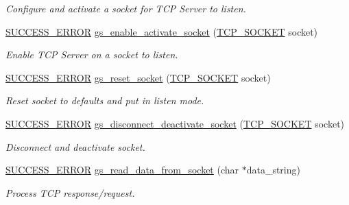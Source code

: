 \begin{DoxyCompactItemize}
\begin{DoxyCompactList}\small\item\em Configure and activate a socket for T\+CP Server to listen. \end{DoxyCompactList}\item 
\hyperlink{group__wireless__interface_ga2e53871073b531f122f463441c113633}{S\+U\+C\+C\+E\+S\+S\+\_\+\+E\+R\+R\+OR} \hyperlink{group__wireless__interface_ga4e5e8f55a064c7537a8398df1d7da8e0}{gs\+\_\+enable\+\_\+activate\+\_\+socket} (\hyperlink{group__wireless__interface_gab2d7ad3f99c2b04b0f5f5a77eefc5355}{T\+C\+P\+\_\+\+S\+O\+C\+K\+ET} socket)
\begin{DoxyCompactList}\small\item\em Enable T\+CP Server on a socket to listen. \end{DoxyCompactList}\item 
\hyperlink{group__wireless__interface_ga2e53871073b531f122f463441c113633}{S\+U\+C\+C\+E\+S\+S\+\_\+\+E\+R\+R\+OR} \hyperlink{group__wireless__interface_gac877437386a7198c2fe889ca2c13a16a}{gs\+\_\+reset\+\_\+socket} (\hyperlink{group__wireless__interface_gab2d7ad3f99c2b04b0f5f5a77eefc5355}{T\+C\+P\+\_\+\+S\+O\+C\+K\+ET} socket)
\begin{DoxyCompactList}\small\item\em Reset socket to defaults and put in listen mode. \end{DoxyCompactList}\item 
\hyperlink{group__wireless__interface_ga2e53871073b531f122f463441c113633}{S\+U\+C\+C\+E\+S\+S\+\_\+\+E\+R\+R\+OR} \hyperlink{group__wireless__interface_ga2e35088a7ecd803f403b6e0afa21b179}{gs\+\_\+disconnect\+\_\+deactivate\+\_\+socket} (\hyperlink{group__wireless__interface_gab2d7ad3f99c2b04b0f5f5a77eefc5355}{T\+C\+P\+\_\+\+S\+O\+C\+K\+ET} socket)
\begin{DoxyCompactList}\small\item\em Disconnect and deactivate socket. \end{DoxyCompactList}\item 
\hyperlink{group__wireless__interface_ga2e53871073b531f122f463441c113633}{S\+U\+C\+C\+E\+S\+S\+\_\+\+E\+R\+R\+OR} \hyperlink{group__wireless__interface_gaf95271b91205e3289d959e4e1ce4c6c3}{gs\+\_\+read\+\_\+data\+\_\+from\+\_\+socket} (char $\ast$data\+\_\+string)
\begin{DoxyCompactList}\small\item\em Process T\+CP response/request. \end{DoxyCompactList}\item 

\end{DoxyCompactItemize}
